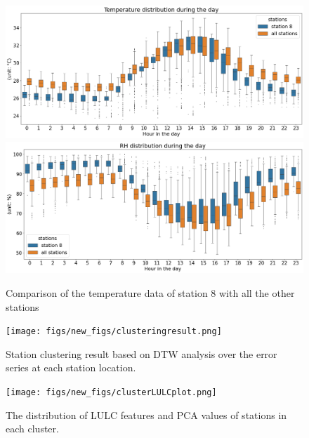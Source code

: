 \documentclass[a4paper,fleqn]{cas-sc}
\begin{document}
\begin{figure}[!h]
	\centering                    
    \includegraphics[width=450pt]{figs/new_figs/station8tem.png}
    \includegraphics[width=450pt]{figs/new_figs/station8RH.png}
	\caption{Comparison of the temperature data of station 8 with all the other stations}
	\label{FIG:station8tem}
\end{figure}


\begin{figure}
	\centering
	\texttt{[image: figs/new\_figs/clusteringresult.png]}
	\caption{Station clustering result based on DTW analysis over the error series at each station location.}
	\label{FIG:Result of DTW clustering}
\end{figure}


\begin{figure}
    \centering
    \texttt{[image: figs/new\_figs/clusterLULCplot.png]}
    \caption{The distribution of LULC features and PCA values of stations in each cluster.}
    \label{fig:DTWclusteringLULCdata}
\end{figure}
\end{document}
